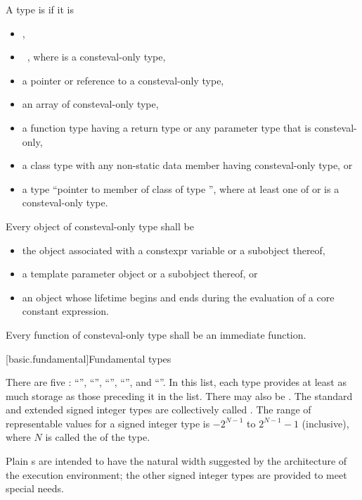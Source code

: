 \pnum
A type is  if it is
\begin{itemize}
\item {},
\item \cv{}~, where  is a consteval-only type,
\item a pointer or reference to a consteval-only type,
\item an array of consteval-only type,
\item a function type having a return type or any parameter type that is consteval-only,
\item a class type with any non-static data member having consteval-only type, or
\item a type ``pointer to member of class  of type '',
where at least one of  or  is a consteval-only type.
\end{itemize}
Every object of consteval-only type shall be
\begin{itemize}
\item
the object associated with a constexpr variable or a subobject thereof,
\item
a template parameter object or a subobject thereof, or
\item
an object whose lifetime begins and ends
during the evaluation of a core constant expression.
\end{itemize}
Every function of consteval-only type shall be
an immediate function.

[basic.fundamental]{Fundamental types}

\pnum
{}%
There are five :
%
%
%
%
%
``'', ``'', ``'',
``'', and ``''. In
this list, each type provides at least as much storage as those
preceding it in the list.
There may also be 
.
The standard and extended signed integer types are collectively called
.
The range of representable values for a signed integer type is
$-2^{N-1}$ to $2^{N-1}-1$ (inclusive),
where $N$ is called the  of the type.
%
\begin{note}
Plain s are intended to have
the natural width suggested by the architecture of the execution environment;
the other signed integer types are provided to meet special needs.
\end{note}

